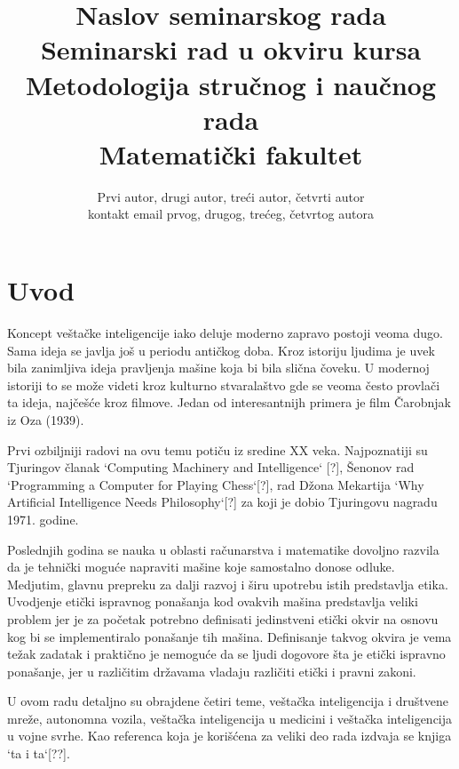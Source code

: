 \documentclass[a4paper]{article}
\begin{document}
\title{Naslov seminarskog rada\\ \small{Seminarski rad u okviru kursa\\Metodologija stručnog i naučnog rada\\ Matematički fakultet}}

\author{Prvi autor, drugi autor, treći autor, četvrti autor\\ kontakt email prvog, drugog, trećeg, četvrtog autora}


\maketitle

\tableofcontents

\newpage

\section{Uvod}
\label{sec:uvod}


Koncept veštačke inteligencije iako deluje moderno zapravo postoji veoma dugo. Sama ideja se javlja još u periodu antičkog doba. Kroz istoriju ljudima je uvek bila zanimljiva ideja pravljenja mašine koja bi bila slična čoveku. U modernoj istoriji to se može videti kroz kulturno stvaralaštvo gde se veoma često provlači ta ideja, najčešće kroz filmove. Jedan od interesantnijh primera je film Čarobnjak iz Oza (1939).

Prvi ozbiljniji radovi na ovu temu potiču iz sredine XX veka. Najpoznatiji su Tjuringov članak `Computing Machinery and Intelligence` [?], Šenonov rad `Programming a Computer for Playing Chess`[?], rad Džona Mekartija `Why Artificial Intelligence Needs Philosophy`[?] za koji je dobio Tjuringovu nagradu 1971. godine. 

Poslednjih godina se nauka u oblasti računarstva i matematike dovoljno razvila da je tehnički moguće napraviti mašine koje samostalno donose odluke. Medjutim, glavnu prepreku za dalji razvoj i širu upotrebu istih predstavlja etika. Uvodjenje etički ispravnog ponašanja kod ovakvih mašina predstavlja veliki problem jer je za početak potrebno definisati jedinstveni etički okvir na osnovu kog bi se implementiralo ponašanje tih mašina. Definisanje takvog okvira je vema težak zadatak i praktično je nemoguće da se ljudi dogovore šta je etički ispravno ponašanje, jer u različitim državama vladaju različiti etički i pravni zakoni.

U ovom radu detaljno su obrajdene četiri teme, veštačka inteligencija i društvene mreže, autonomna vozila, veštačka inteligencija u medicini i veštačka inteligencija u vojne svrhe. Kao referenca koja je korišćena za veliki deo rada izdvaja se knjiga `ta i ta`[??].
\end{document}
